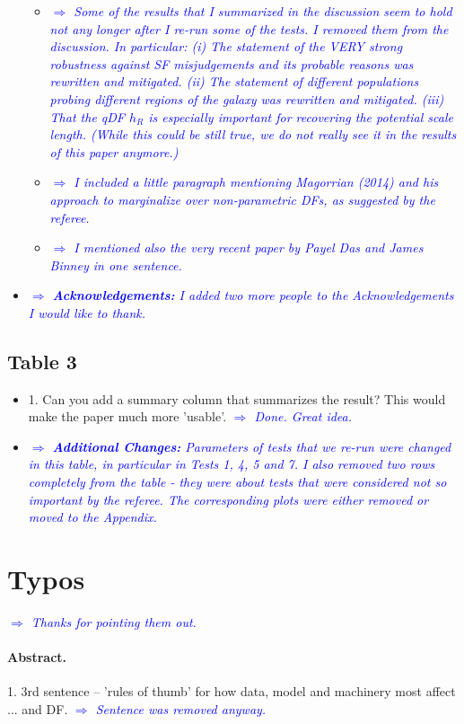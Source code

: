\documentclass[10pt,a4paper]{article}
\newcommand{\Comment}[1]{\textsl{\textcolor{Blue}{$\Longrightarrow$ {#1}}}}
\begin{document}
\begin{itemize}
\begin{itemize}
\item  \Comment{Some of the results that I summarized in the discussion seem to hold not any longer after I re-run some of the tests. I removed them from the discussion. In particular: (i) The statement of the VERY strong robustness against SF misjudgements and its probable reasons was rewritten and mitigated. (ii) The statement of different populations probing different regions of the galaxy was rewritten and mitigated. (iii) That the qDF $h_R$ is especially important for recovering the potential scale length. (While this could be still true, we do not really see it in the results of this paper anymore.)}
\item  \Comment{I included a little paragraph mentioning Magorrian (2014) and his approach to marginalize over non-parametric DFs, as suggested by the referee.}
\item  \Comment{I mentioned also the very recent paper by Payel Das and James Binney in one sentence.}
\end{itemize}
\item \Comment{\textbf{Acknowledgements:} I added two more people to the Acknowledgements I would like to thank.}
\end{itemize}

\subsection{Table 3}
\begin{itemize}
\item 1. Can you add a summary column that summarizes the result? This would make the paper much more 'usable'. \Comment{Done. Great idea.}
\item \Comment{\textbf{Additional Changes:} Parameters of tests that we re-run were changed in this table, in particular in Tests 1, 4, 5 and 7. I also removed two rows completely from the table - they were about tests that were considered not so important by the referee. The corresponding plots were either removed or moved to the Appendix.}
\end{itemize}


\section{Typos}

 \Comment{Thanks for pointing them out.}

\paragraph{Abstract.} 1. 3rd sentence -- 'rules of thumb' for how data, model and machinery most affect ... and DF. \Comment{Sentence was removed anyway.}
\end{document}
